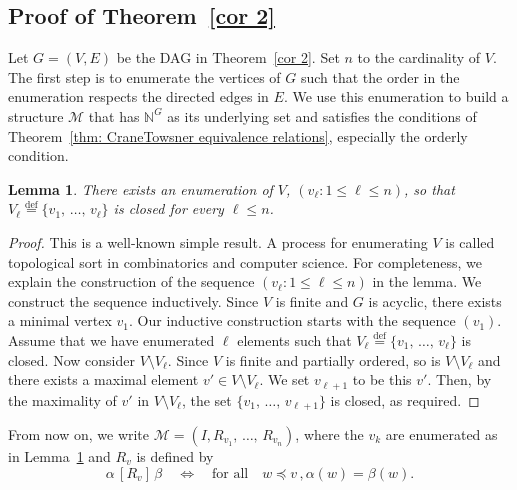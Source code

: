 \documentclass[10pt]{amsart}
\newtheorem{lemm}[theo]{Lemma}\newtheorem{prop}[theo]{Proposition}\newtheorem{coro}[theo]{Corollary}\newtheorem{conj}[theo]{Conjecture}
\theoremstyle{definition}\newtheorem{defi}[theo]{Definition}\newtheorem{rema}[theo]{Remark}\newtheorem{exam}[theo]{Example}\newtheorem{exem}[theo]{Example}\newtheorem{nota}[theo]{Notation}
\newcommand*{\defeq}{\stackrel{\mathrm{def}}{=}}
\newcommand*\N{\mathbb{N}}
\newcommand*\MM{\mathcal{M}}
\newcommand*\M{\MM}
\begin{document}
\subsection{Proof of Theorem~\ref{cor 2}}\label{sec:DAG-exchangeability}

Let $G = (V,E)$ be the DAG in Theorem~\ref{cor 2}. Set $n$ to the cardinality of $V$. The first step is to enumerate the vertices of $G$ such that the order in the enumeration respects the directed edges in $E$. We use this enumeration to build a structure $\M$ that has $\N^G$ as its underlying set and satisfies the conditions of Theorem~\ref{thm: CraneTowsner equivalence relations}, especially the orderly condition.

\begin{lemm}\label{lem: relabeling}
There exists an enumeration of $V$, $(v_\ell : 1 \leq \ell \leq n)$, so that\linebreak
$V_\ell
\defeq \{v_1,\,\ldots,\,v_\ell\}$ is closed for every $\ell \leq n$.
\end{lemm}

\begin{proof}
This is a well-known simple result. A process for enumerating $V$ is called topological sort in combinatorics and computer science. For completeness, we explain the construction of the sequence $(v_\ell : 1 \leq \ell \leq n)$ in the lemma. We construct the sequence inductively. Since $V$ is finite and $G$ is acyclic, there exists a minimal vertex $v_1$. Our inductive construction starts with the sequence $(v_1)$. Assume that we have enumerated $\ell$ elements such that $V_\ell
\defeq \{v_1,\,\ldots,\,v_\ell\}$ is closed. Now consider $V \setminus V_\ell$. Since $V$ is finite and partially ordered, so is $V \setminus V_\ell$ and there exists a maximal element $v' \in V \setminus V_\ell$. We set $v_{\ell+1}$ to be this $v'$. Then, by the maximality of $v'$ in $V \setminus V_\ell$, the set $\{v_1,\,\ldots,\,v_{\ell+1}\}$ is closed, as required.
\end{proof}

From now on, we write $\MM=(I,R_{v_1},\,\ldots,\,R_{v_n})$, where the $v_k$ are enumerated as in Lemma~\ref{lem: relabeling} and $R_v$ is defined by
\[
\alpha\,[R_v]\,\beta\quad\iff\quad
\text{for all}\quad w \preceq v\,, \alpha(w) = \beta(w).
\]
\end{document}
